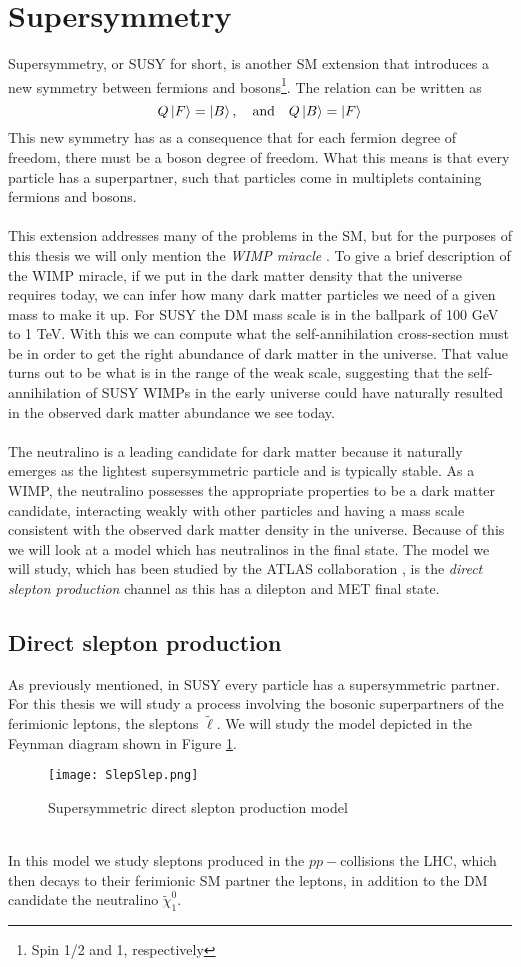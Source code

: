 \documentclass[12pt, a4paper]{book}
\begin{document}
\section{Supersymmetry}
Supersymmetry, or SUSY for short, is another SM extension that introduces a new symmetry between fermions and bosons\footnote{Spin 1/2 and 1, respectively}. The relation can be written as
$$
Q\ket{F} = \ket{B},\quad\text{and}\quad Q\ket{B} = \ket{F}
$$
This new symmetry has as a consequence that for each fermion degree of freedom, there must be a boson degree of freedom. What this means is that every particle has a superpartner, such that particles come in multiplets containing fermions and bosons.\\
\\This extension addresses many of the problems in the SM, but for the purposes of this thesis we will only mention the \textit{WIMP miracle} \cite{JUNGMAN1996195}. 
To give a brief description of the WIMP miracle, if we put in the dark matter density that the universe requires today, we can infer how many dark matter particles we need of a given mass to make it up. 
For SUSY the DM mass scale is in the ballpark of 100 GeV to 1 TeV. With this we can compute what the self-annihilation cross-section must be in order to get the right abundance of dark matter in the universe.
That value turns out to be what is in the range of the weak scale, suggesting that the self-annihilation of SUSY WIMPs in the early universe could have naturally resulted in the observed dark matter abundance we see today.\\
\\The neutralino is a leading candidate for dark matter because it naturally emerges as the lightest supersymmetric particle and is typically stable. As a WIMP, the neutralino possesses the appropriate properties to be a dark matter candidate, 
interacting weakly with other particles and having a mass scale consistent with the observed dark matter density in the universe. Because of this we will look at a model which has neutralinos in the final state. The model we will study, 
which has been studied by the ATLAS collaboration \cite{ATLAS:2022hbt}, is the \textit{direct slepton production} channel as this has a dilepton and MET final state.
\newpage
\subsection{Direct slepton production}
As previously mentioned, in SUSY every particle has a supersymmetric partner. For this thesis we will study a process involving the bosonic superpartners of the ferimionic leptons, the sleptons $\tilde{\ell}$. We will study the model depicted in the Feynman diagram shown in Figure \ref{fig:SlepSlep}.
\graphicspath{{../../figures/}}
\begin{figure}[!ht]
    \centering
    \texttt{[image: SlepSlep.png]}
    \caption{Supersymmetric direct slepton production model}\label{fig:SlepSlep}
\end{figure}
\\In this model we study sleptons produced in the $pp-$collisions the LHC, which then decays to their ferimionic SM partner the leptons, in addition to the DM candidate the neutralino $\tilde{\chi}_1^0$.
\end{document}
